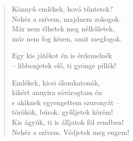 \documentclass[11pt]{extbook}
\newcommand*{\centeredornament}{\centerline{\pgfornament[width=6cm]{88}}}
\begin{document}
\newpage

\vspace*{-15mm}
\centeredornament



\begin{verse}
  Könnyű emlékek, hová tűntetek? \\
  Nehéz a szívem, majdnem zokogok. \\
  Már nem élhetek meg nélkűletek, \\
  már nem fog kézen, amit megfogok.

  Egy kis játékot én is érdemelnék \\
  -- libbenjetek elő, ti gyönge pillék!

  Emlékek, kicsi ólomkatonák, \\
  kikért annyira sóvárogtam én \\
  s akiknek egyengettem szuronyát -- \\
  törökök, búrok, gyűljetek körém! \\
  Kis ágyúk, ti is álljatok föl rendben! \\
  Nehéz a szívem. Védjetek meg engem!
\end{verse}

\newpage


\vspace*{-15mm}
\centeredornament


\end{document}
